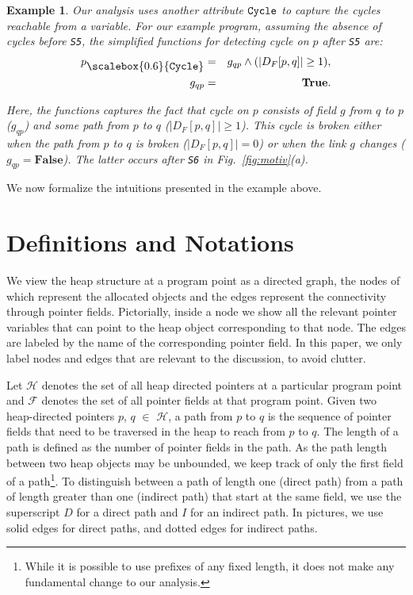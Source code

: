 \documentclass{sig-alternate}
\newtheorem{example}{Example}
\newcommand{\p}{\ensuremath{p}}
\newcommand{\q}{\ensuremath{q}}
\newcommand{\drct}{\ensuremath{D}}
\newcommand{\indrct}{\ensuremath{I}}
\newcommand{\heap}{\ensuremath{\mathcal{H}}}
\newcommand{\fields}{\ensuremath{\mathcal{F}}}
\newcommand{\subC}{\mbox{\scalebox{0.6}{\Cycle}}}
\newcommand{\num}[1]{\ensuremath{|#1|}}
\newcommand{\DFM}[2]{\ensuremath{D_F[#1,#2]}}
\newcommand{\Cycle}{{\tt Cycle}}
\newcommand{\false}{\textbf{False}}
\newcommand{\true}{\textbf{True}}
\begin{document}
\begin{example}
{Our analysis uses  another attribute ${\Cycle}$ to capture the
cycles reachable  from a  variable. For our  example program,
assuming  the   absence  of  cycles  before   {\tt  S5},  the
simplified  functions for  detecting cycle  on $\p$ after
{\tt S5} are:
\begin{eqnarray*}
p_{\subC} &=& g_{qp} \wedge (\num{\DFM{p}{q}} \geq 1), \\
g_{qp}    &=& \true.
\end{eqnarray*}

Here, the functions captures the fact that cycle on $\p$
 consists of field $g$ from $\q$ to $\p$ ($g_{qp}$)
and some path from $\p$ to $\q$ ($\num{\DFM{p}{q}} \geq
1$). This cycle is broken either when the path from $\p$
to $\q$ is broken ($\num{\DFM{p}{q}} = 0$) or when the link $g$
changes ($g_{qp} = \false$). The latter occurs after
{\tt S6} in Fig.~\ref{fig:motiv}(a).  
}
\hfill\psframebox{}  
\end{example}

We now formalize the intuitions presented in the example
above.

\section{Definitions and Notations} \label{sec:Formal_Definitions}

We view the heap structure at a program point as a directed
graph, the nodes of which represent the allocated objects and
the edges represent the connectivity through pointer fields.
Pictorially, inside a node we show all the relevant pointer
variables that can point to the heap object corresponding to
that node. The edges are labeled by the name of the
corresponding pointer field. In this paper, we only label
nodes and edges that are relevant to the discussion, to avoid
clutter.

Let $\heap$ denotes the set of all heap directed
pointers at a particular program point and $\fields$
denotes the set of all pointer fields at that program point.
Given two heap-directed pointers $\p$, $\q$ $\in$
$\heap$, a path from $\p$ to $\q$ is the sequence
of pointer fields that need to be traversed in the heap to
reach from $\p$ to $\q$.  The length of a path is
defined as the number of pointer fields in the path.  As the
path length between two heap objects may be unbounded, we
keep track of only the first field of a path\footnote{
  While it is possible to use prefixes of any fixed length,
  it does not make any fundamental change to our
  analysis.}. To distinguish between a path of length one
(direct path) from a path of length greater than one
(indirect path) that start at the same field, we use the
superscript $\drct$ for a direct path and $\indrct$ for an
indirect path. In pictures, we use solid edges for direct
paths, and dotted edges for indirect paths.
\end{document}

